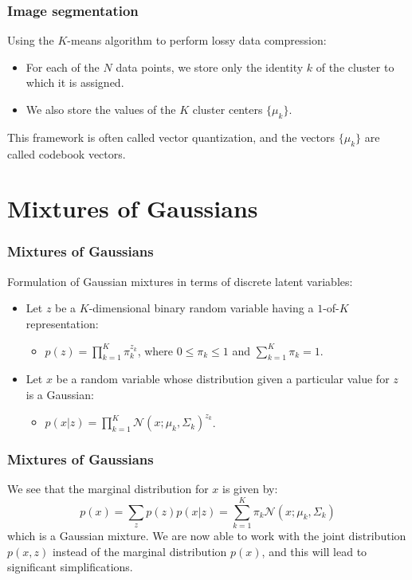 \documentclass{beamer}
\begin{document}
\begin{frame}
    \frametitle{Image segmentation}
    Using the $K$-means algorithm to perform lossy data compression:
    \begin{itemize}
        \item For each of the $N$ data points, we store only the identity $k$ of the cluster to which it is assigned.
        \item We also store the values of the $K$ cluster centers $\{\mu_{k}\}$.
    \end{itemize}
    This framework is often called vector quantization, and the vectors $\{\mu_{k}\}$ are called codebook vectors.
\end{frame}

\section{Mixtures of Gaussians}

\begin{frame}
    \frametitle{Mixtures of Gaussians}
    Formulation of Gaussian mixtures in terms of discrete latent variables:
    \begin{itemize}
        \item Let $z$ be a $K$-dimensional binary random variable having a $1$-of-$K$ representation:
        \begin{itemize}
            \item $p(z)=\prod_{k=1}^{K}\pi_{k}^{z_{k}}$, where $0\le\pi_{k}\le{}1$ and $\sum_{k=1}^{K}\pi_{k}=1$.
        \end{itemize}
        \item Let $x$ be a random variable whose distribution given a particular value for $z$ is a Gaussian:
        \begin{itemize}
            \item $p(x|z)=\prod_{k=1}^{K}\mathcal{N}(x;\mu_{k},\Sigma_{k})^{z_{k}}$.
        \end{itemize}
    \end{itemize}
\end{frame}

\begin{frame}
    \frametitle{Mixtures of Gaussians}
    We see that the marginal distribution for $x$ is given by:
    \begin{equation*}
        p(x)=\sum_{z}p(z)p(x|z)=\sum_{k=1}^{K}\pi_{k}\mathcal{N}(x;\mu_{k},\Sigma_{k})
    \end{equation*}
    which is a Gaussian mixture. We are now able to work with the joint distribution $p(x,z)$ instead of the marginal distribution $p(x)$, and this will lead to significant simplifications.
\end{frame}
\end{document}
